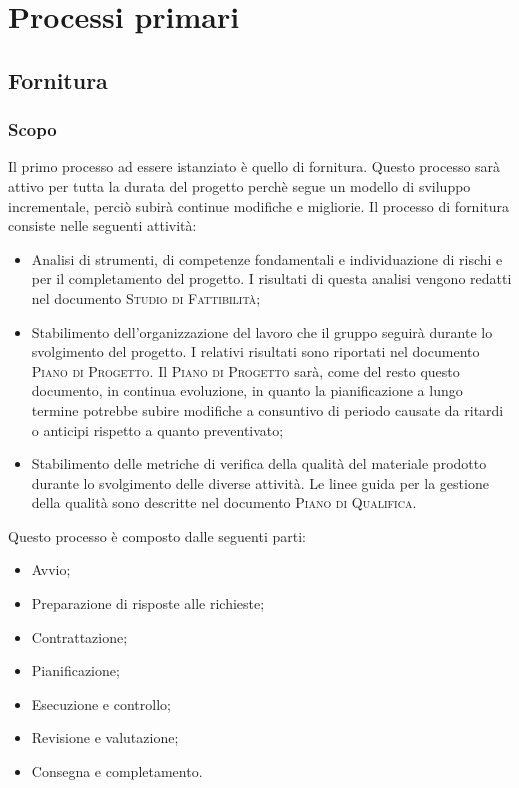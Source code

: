 \section{Processi primari}
\label{sec:processi_primari}

\subsection{Fornitura}

\subsubsection{Scopo}

Il primo processo ad essere istanziato è quello di fornitura. Questo processo sarà attivo per tutta la durata del 
progetto perchè segue un modello di sviluppo incrementale, perciò subirà continue modifiche e migliorie.
Il processo di fornitura consiste nelle seguenti attività:
\begin{itemize}
    \item Analisi di strumenti, di competenze fondamentali e individuazione di rischi e  per il 
    completamento del progetto. I risultati di questa analisi vengono redatti nel documento 
    \textsc{Studio di Fattibilità};
    \item Stabilimento dell'organizzazione del lavoro che il gruppo seguirà durante lo svolgimento del progetto. 
    I relativi risultati sono riportati nel documento \textsc{Piano di Progetto}. 
    Il \textsc{Piano di Progetto} sarà, come del resto questo documento, in continua evoluzione, in quanto la 
    pianificazione a lungo termine potrebbe subire modifiche a consuntivo di periodo causate da ritardi o anticipi 
    rispetto a quanto preventivato;
    \item Stabilimento delle metriche di verifica della qualità del materiale prodotto durante lo svolgimento delle 
    diverse attività. Le linee guida per la gestione della qualità sono descritte nel documento 
    \textsc{Piano di Qualifica}.
\end{itemize}

Questo processo è composto dalle seguenti parti:
\begin{itemize}
    \item Avvio;
    \item Preparazione di risposte alle richieste;
    \item Contrattazione;
    \item Pianificazione;
    \item Esecuzione e controllo;
    \item Revisione e valutazione;
    \item Consegna e completamento.
\end{itemize}


